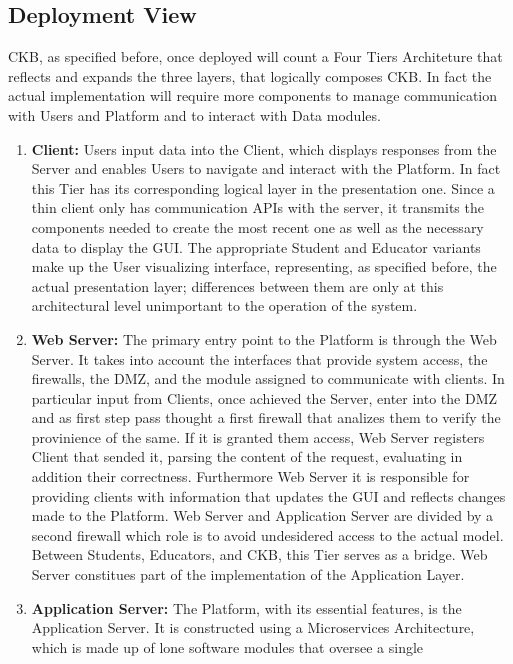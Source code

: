 \subsection{Deployment View}
CKB, as specified before, once deployed will count a Four Tiers Architeture that reflects and expands the three layers, that logically composes CKB.
In fact the actual implementation will require more components to manage communication with Users and Platform and to interact with Data modules.
\begin{enumerate}[label=$\bullet$]
    \item \textbf{Client:} Users input data into the Client, which displays responses from the Server and enables Users to navigate and interact with the Platform. In fact this Tier has its corresponding logical layer in the presentation one. 
    Since a thin client only has communication APIs with the server, it transmits the components needed to create the most recent one as well as the necessary data to display the GUI.
    The appropriate Student and Educator variants make up the User visualizing interface, representing, as specified before, the actual presentation layer; differences between them 
    are only at this architectural level unimportant to the operation of the system.
    \item \textbf{Web Server:} The primary entry point to the Platform is through the Web Server. It takes into account the interfaces that provide system access, the firewalls, the DMZ, and the module assigned to communicate with 
    clients. In particular input from Clients, once achieved the Server, enter into the DMZ and as first step pass thought a first firewall that analizes them to verify the provinience of the same. If it is granted them access, Web Server registers Client that sended it, parsing the content of the request, evaluating in addition their correctness. 
    Furthermore Web Server it is responsible for providing clients with information that updates the GUI and reflects changes made to the Platform. Web Server and Application Server are divided by a second firewall which role is to avoid undesidered access to the actual model. Between Students, Educators, 
    and CKB, this Tier serves as a bridge. Web Server constitues part of the implementation of the Application Layer.
    \item \textbf{Application Server:} The Platform, with its essential features, is the Application Server. It is constructed using a Microservices Architecture, which is made up of lone software modules that oversee a single 

\end{enumerate}
